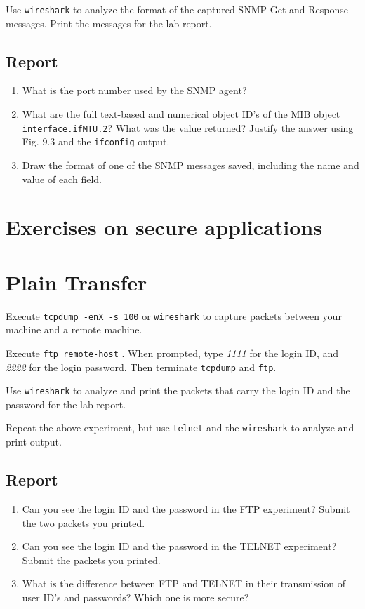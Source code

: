 \documentclass{../UTNetLab}
\begin{document}
	Use \lstinline{wireshark} to analyze the format of the captured SNMP Get and Response messages. Print the messages for the lab report.
	
	\subsection*{Report}
	\begin{enumerate}
		\item What is the port number used by the SNMP agent?
		\item What are the full text-based and numerical object ID’s of the MIB object \texttt{interface.ifMTU.2}? What was the value returned? Justify the answer using Fig. 9.3 and the \lstinline{ifconfig} output.
		\item Draw the format of one of the SNMP messages saved, including the name and value of each field.
	\end{enumerate}

\section*{Exercises on secure applications}
	
\section{Plain Transfer}
	Execute \lstinline{tcpdump -enX -s 100} or \lstinline{wireshark} to capture packets between your machine and a remote machine.

	Execute \lstinline[emph={remote-host}]{ftp remote-host} . When prompted, type \textit{1111} for the login ID, and \textit{2222} for the login password. Then terminate \lstinline{tcpdump} and \lstinline{ftp}.

	Use \lstinline{wireshark} to analyze and print the packets that carry the login ID and the password for the lab report.

	Repeat the above experiment, but use \lstinline{telnet} and the \lstinline{wireshark} to analyze and print output.

	\subsection*{Report}
	\begin{enumerate}
		\item Can you see the login ID and the password in the FTP experiment? Submit the two packets you printed.
		\item Can you see the login ID and the password in the TELNET experiment? Submit the packets you printed.
		\item What is the difference between FTP and TELNET in their transmission of user ID’s and passwords? Which one is more secure?
	\end{enumerate}
\end{document}
